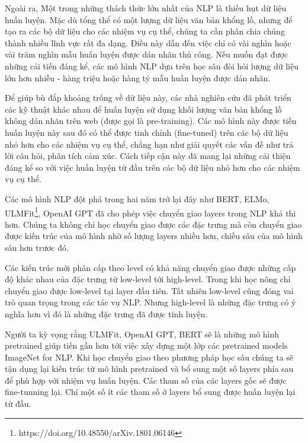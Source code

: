 Ngoài ra, Một trong những thách thức lớn nhất của NLP là thiếu hụt dữ liệu huấn luyện. Mặc dù tổng thể có một lượng dữ liệu văn bản khổng lồ, nhưng để tạo ra các bộ dữ liệu cho các nhiệm vụ cụ thể, chúng ta cần phân chia chúng thành nhiều lĩnh vực rất đa dạng. Điều này dẫn đến việc chỉ có vài nghìn hoặc vài trăm nghìn mẫu huấn luyện được dán nhãn thủ công. Nếu muốn đạt được những cải tiến đáng kể, các mô hình NLP dựa trên học sâu đòi hỏi lượng dữ liệu lớn hơn nhiều - hàng triệu hoặc hàng tỷ mẫu huấn luyện được dán nhãn.

Để giúp bù đắp khoảng trống về dữ liệu này, các nhà nghiên cứu đã phát triển các kỹ thuật khác nhau để huấn luyện sử dụng khối lượng văn bản khổng lồ không dán nhãn trên web (được gọi là pre-training). Các mô hình này được tiền huấn luyện này sau đó có thể được tinh chỉnh (fine-tuned) trên các bộ dữ liệu nhỏ hơn cho các nhiệm vụ cụ thể, chẳng hạn như giải quyết các vấn đề như trả lời câu hỏi, phân tích cảm xúc. Cách tiếp cận này đã mang lại những cải thiện đáng kể so với việc huấn luyện từ đầu trên các bộ dữ liệu nhỏ hơn cho các nhiệm vụ cụ thể. 

Các mô hình NLP đột phá trong hai năm trở lại đây như BERT, ELMo, ULMFit\footnote{https://doi.org/10.48550/arXiv.1801.06146}, OpenAI GPT đã cho phép việc chuyển giao layers trong NLP khả thi hơn. Chúng ta không chỉ học chuyển giao được các đặc trưng mà còn chuyển giao được kiến trúc của mô hình nhờ số lượng layers nhiều hơn, chiều sâu của mô hình sâu hơn trươc đó.

Các kiến trúc mới phân cấp theo level có khả năng chuyển giao được những cấp độ khác nhau của đặc trưng từ low-level tới high-level. Trong khi học nông chỉ chuyển giao được low-level tại layer đầu tiên. Tất nhiên low-level cũng đóng vai trò quan trọng trong các tác vụ NLP. Nhưng high-level là những đặc trưng có ý nghĩa hơn vì đó là những đặc trưng đã được tinh luyện.

Người ta kỳ vọng rằng ULMFit, OpenAI GPT, BERT sẽ là những mô hình pretrained giúp tiến gần hơn tới việc xây dựng một lớp các pretrained models ImageNet for NLP. Khi học chuyển giao theo phương pháp học sâu chúng ta sẽ tận dụng lại kiến trúc từ mô hình pretrained và bổ sung một số layers phía sau để phù hợp với nhiệm vụ huấn luyện. Các tham số của các layers gốc sẽ được fine-tunning lại. Chỉ một số ít các tham số ở layers bổ sung được huấn luyện lại từ đầu\cite{webpage20}.
